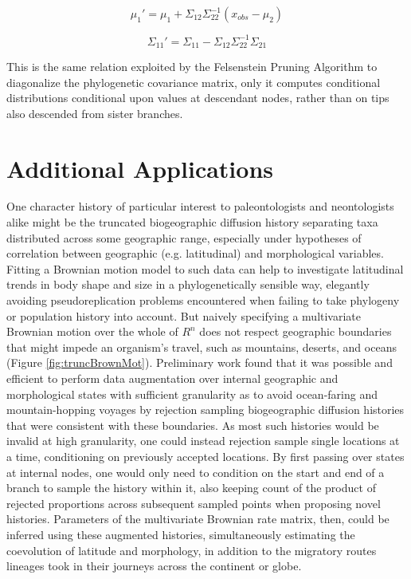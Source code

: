 {\large\[\mu_1' = \mu_1 + \Sigma_{12}\Sigma_{22}^{-1}(x_{obs}-\mu_2)\]}

{\large\[\Sigma_{11}' = \Sigma_{11} - \Sigma_{12}\Sigma_{22}^{-1}\Sigma_{21}\]}

This is the same relation exploited by the Felsenstein Pruning Algorithm to diagonalize the phylogenetic covariance matrix, only it computes conditional distributions conditional upon values at descendant nodes, rather than on tips also descended from sister branches. 

\clearpage

\section{Additional Applications}

One character history of particular interest to paleontologists and neontologists alike might be the truncated biogeographic diffusion history separating taxa distributed across some geographic range, especially under hypotheses of correlation between geographic (e.g. latitudinal) and morphological variables. Fitting a Brownian motion model to such data can help to investigate latitudinal trends in body shape and size in a phylogenetically sensible way, elegantly avoiding pseudoreplication problems encountered when failing to take phylogeny or population history into account. But naively specifying a multivariate Brownian motion over the whole of $R^n$ does not respect geographic boundaries that might impede an organism's travel, such as mountains, deserts, and oceans (Figure \ref{fig:truncBrownMot}). Preliminary work found that it was possible and efficient to perform data augmentation over internal geographic and morphological states with sufficient granularity as to avoid ocean-faring and mountain-hopping voyages by rejection sampling biogeographic diffusion histories that were consistent with these boundaries. As most such histories would be invalid at high granularity, one could instead rejection sample single locations at a time, conditioning on previously accepted locations. By first passing over states at internal nodes, one would only need to condition on the start and end of a branch to sample the history within it, also keeping count of the product of rejected proportions across subsequent sampled points when proposing novel histories. Parameters of the multivariate Brownian rate matrix, then, could be inferred using these augmented histories, simultaneously estimating the coevolution of latitude and morphology, in addition to the migratory routes lineages took in their journeys across the continent or globe. 

